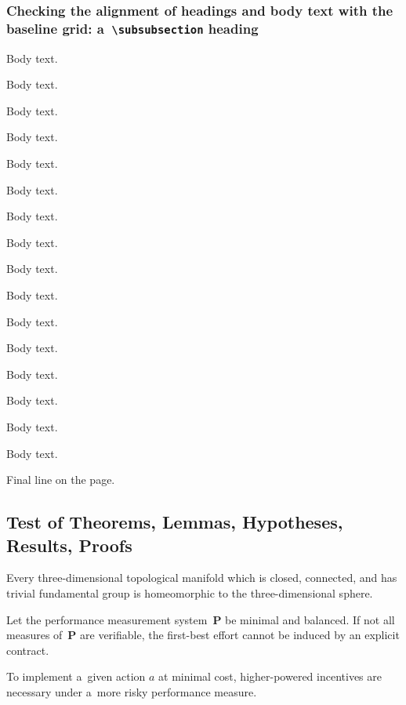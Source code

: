 \subsubsection*{Checking the alignment of headings and body text with the baseline grid: a~\texttt{\textbackslash subsubsection} heading}
Body text.\displaybaselinegrid \par
Body text. \par
Body text. \par
Body text. \par
Body text. \par
Body text. \par
Body text. \par
Body text. \par
Body text. \par
Body text. \par
Body text. \par
Body text. \par
Body text. \par
Body text. \par
Body text. \par
Body text. \par
Final line on the page. \par
\endgroup

\pagebreak

\subsection{Test of Theorems, Lemmas, Hypotheses, Results, Proofs}

\begin{conjecture}
	\label{conjecture:poincare}
	Every three-dimensional topological manifold which is closed, connected, and has trivial fundamental group is homeomorphic to the three-dimensional sphere.
\end{conjecture}

\begin{corollary}
	\label{corollary:budde}
	Let the performance measurement system~$\bm{P}$ be minimal and balanced. If not all measures of~$\bm{P}$ are verifiable, the first-best effort cannot be induced by an explicit contract.
\end{corollary}

\begin{lemma}
	\label{lemma:budde-kraekel-1}
	To implement a~given action $a$ at minimal cost, higher-powered
	incentives are necessary under a~more risky performance measure.
\end{lemma}

